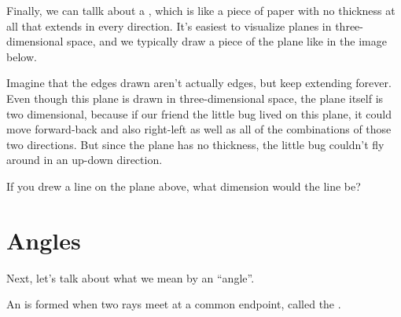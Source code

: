 \documentclass{ximera}
\begin{document}
Finally, we can tallk about a , which is like a piece of paper with no thickness at all that extends in every direction. It's easiest to visualize planes in three-dimensional space, and we typically draw a piece of the plane like in the image below.
\begin{image}
\end{image}
Imagine that the edges drawn aren't actually edges, but keep extending forever. Even though this plane is drawn in three-dimensional space, the plane itself is two dimensional, because if our friend the little bug lived on this plane, it could move forward-back and also right-left as well as all of the combinations of those two directions. But since the plane has no thickness, the little bug couldn't fly around in an up-down direction.

\begin{question}
If you drew a line on the plane above, what dimension would the line be?
\begin{multipleChoice}
\end{multipleChoice}
\end{question}




\section{Angles}

Next, let's talk about what we mean by an ``angle''.

\begin{definition}
An   is formed when two rays meet at a common endpoint, called the .
\begin{image}
\end{image}
\end{definition}
\end{document}
